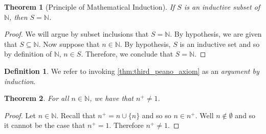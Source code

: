 \documentclass{article}
\theoremstyle{definition}
\newtheorem{definition}{Definition}[section]
\theoremstyle{definition}
\theoremstyle{plain}
\theoremstyle{remark}
\theoremstyle{plain}
\newtheorem{theorem}{Theorem}[section]
\theoremstyle{remark}
\theoremstyle{plain}
\newtheorem{lemma}{Lemma}[section]
\theoremstyle{plain}
\theoremstyle{plain}
\newtheorem{axiom}{Axiom}[section]
\theoremstyle{plain}
\begin{document}
\begin{theorem}[Principle of Mathematical Induction]
  If \( S \) is an inductive subset of \( \mathbb{N} \), then 
  \( S = \mathbb{N} \).
  \label{thm:third_peano_axiom}
\end{theorem}

\begin{proof}
  We will argue by subset inclusions that \( S = \mathbb{N} \). By hypothesis, 
  we are given that \( S \subseteq \mathbb{N} \). 
  Now suppose that \( n \in \mathbb{N} \). By hypothesis, \( S \) is an 
  inductive set and so by definition of \( \mathbb{N} \), \( n \in S \). 
  Therefore, we conclude that \( S = \mathbb{N} \).
\end{proof}

\begin{definition}
  We refer to invoking \autoref{thm:third_peano_axiom} as an \textit{argument
  by induction}.
\end{definition}

\begin{theorem}
  For all \( n \in \mathbb{N} \), we have that \( n^{+} \neq 1 \). 
  \label{thm:fourth_peano_axiom}
\end{theorem}

\begin{proof}
  Let \( n \in \mathbb{N} \). Recall that \( n^{+} = n \cup \{ n \} \) and so 
  so \( n \in n^{+} \). Well \( n \not\in \emptyset \) and so it cannot be the 
  case that \( n^{+} = 1 \). Therefore \( n^{+} \neq 1 \).
\end{proof}


% 
% 
\end{document}
